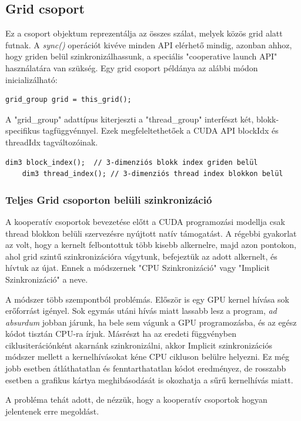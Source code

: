 \subsection{Grid csoport}
Ez a csoport objektum reprezentálja az összes szálat, melyek közös grid alatt futnak. A \textit{sync()} operációt kivéve minden API elérhető mindig, azonban ahhoz, hogy griden belül szinkronizálhassunk, a speciális "cooperative launch API" használatára van szükség.
Egy grid csoport példánya az alábbi módon inicializálható:
\begin{lstlisting}[style=CStyle]
	grid_group grid = this_grid();
\end{lstlisting}
A "grid\_group" adattípus kiterjeszti a "thread\_group" interfészt két, blokk-specifikus tagfüggvénnyel. Ezek megfeleltethetőek a CUDA API blockIdx és threadIdx tagváltozóinak.
\begin{lstlisting}[style=CStyle]
	dim3 block_index();  // 3-dimenziós blokk index griden belül
	dim3 thread_index(); // 3-dimenziós thread index blokkon belül
\end{lstlisting}

\subsubsection{Teljes Grid csoporton belüli szinkronizáció}
\label{subsubsec:Grid}
A kooperatív csoportok bevezetése előtt a CUDA programozási modellja csak thread blokkon belüli szervezésre nyújtott natív támogatást. A régebbi gyakorlat az volt, hogy a kernelt felbontottuk több kisebb alkernelre, majd azon pontokon, ahol grid szintű szinkronizációra vágytunk, befejeztük az adott alkernelt, és hívtuk az újat. Ennek a módszernek "CPU Szinkronizáció" vagy "Implicit Szinkronizáció" a neve. 

A módszer több szempontból problémás. Először is egy GPU kernel hívása sok erőforrást igényel. Sok egymás utáni hívás miatt lassabb lesz a program, \textit{ad absurdum} jobban járunk, ha bele sem vágunk a GPU programozásba, és az egész kódot tisztán CPU-ra írjuk. Másrészt ha az eredeti függvényben ciklusiterációnként akarnánk szinkronizálni, akkor Implicit szinkronizációs módszer mellett a kernelhívásokat kéne CPU cikluson belülre helyezni. Ez még jobb esetben átláthatatlan és fenntarthatatlan kódot eredményez, de rosszabb esetben a grafikus kártya meghibásodását is okozhatja a sűrű kernelhívás miatt. 

A probléma tehát adott, de nézzük, hogy a kooperatív csoportok hogyan jelentenek erre megoldást.

